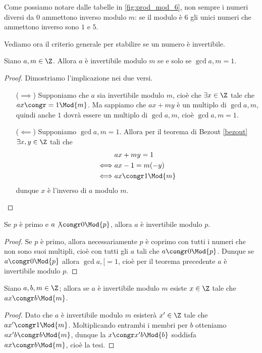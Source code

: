 Come possiamo notare dalle tabelle in \autoref{fig:prod_mod_6}, non sempre i numeri diversi da $0$ ammettono inverso modulo $m$: se il modulo è $6$ gli unici numeri che ammettono inverso sono $1$ e $5$.

Vediamo ora il criterio generale per stabilire se un numero è invertibile.

\begin{theorem}\label{invertibilita_mod_m}
    Siano $a, m \in \Z$. Allora $a$ è invertibile modulo $m$ se e solo se $\gcd{a, m} = 1$. 
\end{theorem}
\begin{proof}
    Dimostriamo l'implicazione nei due versi.
    \begin{itemize}
        \item[($\implies$)] Supponiamo che $a$ sia invertibile modulo $m$, cioè che $\exists x \in \Z$ tale che $ax \congr= 1 \Mod{m}$. Ma sappiamo che $ax + my$ è un multiplo di $\gcd{a, m}$, quindi anche $1$ dovrà essere un multiplo di $\gcd{a, m}$, cioè $\gcd{a, m} = 1$.
        \item[($\impliedby$)] Supponiamo $\gcd{a, m} = 1$. Allora per il teorema di Bezout \ref{bezout} $\exists x, y \in \Z$ tali che
        \begin{alignat*}{1}
            &ax + my = 1 \\
            \iff &ax - 1 = m(-y) \\
            \iff &ax \congr 1 \Mod{m}
        \end{alignat*}
        dunque $x$ è l'inverso di $a$ modulo $m$. \qedhere
    \end{itemize}
\end{proof}

\begin{corollary}
    Se $p$ è primo e $a \not\congr 0 \Mod{p}$, allora $a$ è invertibile modulo $p$.
\end{corollary}
\begin{proof}
    Se $p$ è primo, allora necessariamente $p$ è coprimo con tutti i numeri che non sono suoi multipli, cioè con tutti gli $a$ tali che $a \congr 0 \Mod{p}$. Dunque se $a \congr 0 \Mod{p}$ allora $\gcd{a, [} = 1$, cioè per il teorema precedente $a$ è invertibile modulo $p$.
\end{proof}

\begin{proposition} \label{se_invertibile_allora_soluzione}
    Siano $a, b, m \in \Z$; allora se $a$ è invertibile modulo $m$ esiste $x \in \Z$ tale che $ax \congr b \Mod{m}$.
\end{proposition}
\begin{proof}
    Dato che $a$ è invertibile modulo $m$ esisterà $x^\prime \in \Z$ tale che $ax^\prime \congr 1 \Mod{m}$. Moltiplicando entrambi i membri per $b$ otteniamo $ax'b \congr b \Mod{m}$, dunque la $x \congr x'b \Mod{b}$ soddisfa $ax \congr b \Mod{m}$, cioè la tesi.
\end{proof}

